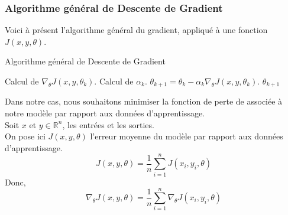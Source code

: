 \documentclass[10pt,a4paper]{report}
\begin{document}
			\subsubsection{Algorithme général de Descente de Gradient}
			Voici à présent l'algorithme général du gradient, appliqué à une fonction $J(x,y,\theta)$.
			\begin{algorithm}[H]
				\caption{Algorithme général de Descente de Gradient}
				\begin{algorithmic}
				    \REPEAT
				    	\STATE Calcul de $\nabla_\theta J(x,y,\theta_k)$.
				    	\STATE Calcul de $\alpha_k$.
				    	\STATE $\theta_{k+1} = \theta_k - \alpha_k \nabla_\theta J(x,y,\theta_k)$.
				    \RETURN $\theta_{k+1}$
				\end{algorithmic}
			\end{algorithm}
			Dans notre cas, nous souhaitons minimiser la fonction de perte de associée à notre modèle par rapport aux données d'apprentissage.\\
			Soit $x$ et $y \in \mathbb{R}^n$, les entrées et les sorties.\\
			On pose ici $J(x,y,\theta)$ l'erreur moyenne du modèle par rapport aux données d'apprentissage.
			$$J(x,y,\theta) = \frac{1}{n} \sum_{i=1}^{n}{J(x_i,y_i,\theta)}$$
			Donc,
				$$\nabla_\theta J(x,y,\theta) = \frac{1}{n} \sum_{i=1}^{n}{\nabla_\theta J(x_i,y_i,\theta)}$$
			\			
\end{document}
